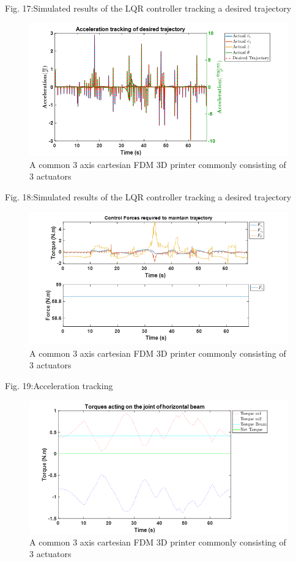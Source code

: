 \documentclass{UoNMCHA}
\numberwithin{equation}{section}
\begin{document}
Fig. 17:Simulated results of the LQR controller tracking a desired trajectory

\begin{figure}[H]
	\begin{center}
		\includegraphics[width=.5\linewidth]{figs/Picture29}
		\caption{A  common 3 axis cartesian FDM 3D printer commonly consisting of 3 actuators}
		\label{figs/Picture29}
	\end{center}
\end{figure}


Fig. 18:Simulated results of the LQR controller tracking a desired trajectory

\begin{figure}[H]
	\begin{center}
		\includegraphics[width=.5\linewidth]{figs/Picture30}
		\caption{A  common 3 axis cartesian FDM 3D printer commonly consisting of 3 actuators}
		\label{figs/Picture30}
	\end{center}
\end{figure}


Fig. 19:Acceleration tracking 

\begin{figure}[H]
	\begin{center}
		\includegraphics[width=.5\linewidth]{figs/Picture31}
		\caption{A  common 3 axis cartesian FDM 3D printer commonly consisting of 3 actuators}
		\label{figs/Picture31}
	\end{center}
\end{figure}
\end{document}
